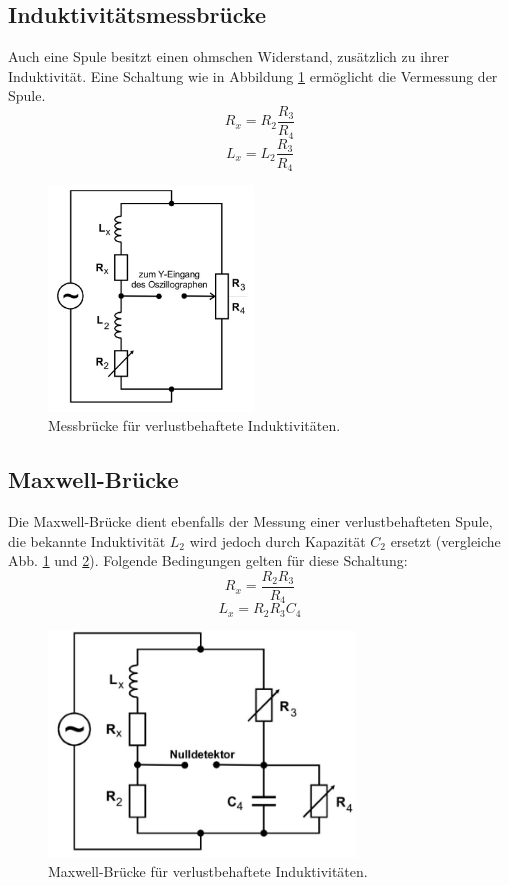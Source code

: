 \subsection{Induktivitätsmessbrücke}
\label{sec:Theorei3}
Auch eine Spule besitzt einen ohmschen Widerstand, zusätzlich zu ihrer Induktivität.
Eine Schaltung wie in Abbildung \ref{fig:Schaltung4} ermöglicht die Vermessung der Spule.
\begin{equation}
  R_x = R_2 \frac{R_3}{R_4}
  \label{eqn:gl7}
\end{equation}
\begin{equation}
  L_x = L_2 \frac{R_3}{R_4}
  \label{eqn:gl8}
\end{equation}
\begin{figure}
  \includegraphics[height=6cm]{data/Schaltung4.jpg}
  \centering
  \caption{Messbrücke für verlustbehaftete Induktivitäten.}
  \label{fig:Schaltung4}
\end{figure}
\FloatBarrier

\subsection{Maxwell-Brücke}
\label{sec:Theorie4}
Die Maxwell-Brücke dient ebenfalls der Messung einer verlustbehafteten Spule, die bekannte Induktivität $L_2$ wird jedoch durch Kapazität $C_2$ ersetzt (vergleiche Abb. \ref{fig:Schaltung4} und \ref{fig:Schaltung5}).
Folgende Bedingungen gelten für diese Schaltung:
\begin{equation}
  R_x = \frac{R_2 R_3}{R_4}
  \label{eqn:gl9}
\end{equation}
\begin{equation}
  L_x = R_2 R_3 C_4
  \label{eqn:gl10}
\end{equation}
\begin{figure}
  \includegraphics[height=6cm]{data/Schaltung5.jpg}
  \centering
  \caption{Maxwell-Brücke für verlustbehaftete Induktivitäten.}
  \label{fig:Schaltung5}
\end{figure}
\FloatBarrier

